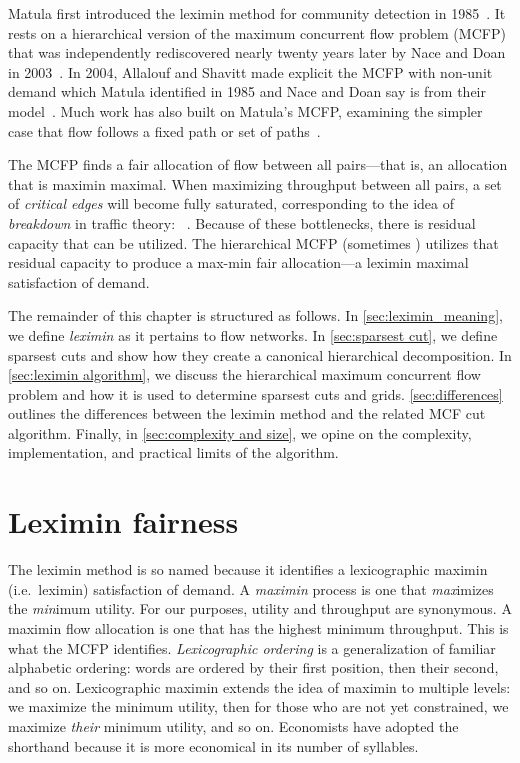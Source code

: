 Matula first introduced the leximin method for community detection in 1985~\cite{matula1985divisive}. It rests on a hierarchical version of the maximum concurrent flow problem (MCFP) that was independently rediscovered nearly twenty years later by Nace and Doan in 2003~\cite{nace2003some}. In 2004, Allalouf and Shavitt made explicit the MCFP with non-unit demand which Matula identified in 1985 and Nace and Doan say is  from their model~\cite{allalouf2004maximum}. Much work has also built on Matula's MCFP, examining the simpler case that flow follows a fixed path or set of paths~\cite{pioro2003efficient, nace2003some, nace2006tutorial}.

The MCFP finds a fair allocation of flow between all pairs---that is, an allocation that is maximin maximal. When maximizing throughput between all pairs, a set of \emph{critical edges} will become fully saturated, corresponding to the idea of \emph{breakdown} in traffic theory: ~\cite{kerner2009traffic}. Because of these bottlenecks, there is residual capacity that can be utilized. The hierarchical MCFP (sometimes ) utilizes that residual capacity to produce a max-min fair allocation---a leximin maximal satisfaction of demand.

The remainder of this chapter is structured as follows. In \autoref{sec:leximin_meaning}, we define \emph{leximin} as it pertains to flow networks. In \autoref{sec:sparsest cut}, we define sparsest cuts and show how they create a canonical hierarchical decomposition. In \autoref{sec:leximin algorithm}, we discuss the hierarchical maximum concurrent flow problem and how it is used to determine sparsest cuts and grids. \autoref{sec:differences} outlines the differences between the leximin method and the related MCF cut algorithm. Finally, in \autoref{sec:complexity and size}, we opine on the complexity, implementation, and practical limits of the algorithm.






\section{Leximin fairness} \label{sec:leximin_meaning}

The leximin method is so named because it identifies a lexicographic maximin (i.e.\ leximin) satisfaction of demand. A \emph{maximin} process is one that \emph{max}imizes the \emph{min}imum utility. For our purposes, utility and throughput are synonymous. A maximin flow allocation is one that has the highest minimum throughput. This is what the MCFP identifies. \emph{Lexicographic ordering} is a generalization of familiar alphabetic ordering: words are ordered by their first position, then their second, and so on. Lexicographic maximin extends the idea of maximin to multiple levels: we maximize the minimum utility, then for those who are not yet constrained, we maximize \emph{their} minimum utility, and so on. Economists have adopted the shorthand  because it is more economical in its number of syllables.

